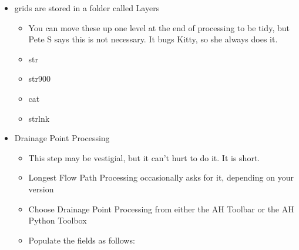 \documentclass[letterpaper,10pt,english]{sphinxmanual}
\begin{document}
\begin{itemize}
\item {} 
grids are stored in a folder called Layers
\begin{itemize}
\item {} 
You can move these up one level at the end of processing to be tidy, but Pete S says this is not necessary. It bugs Kitty, so she always does it.

\item {} 
str

\item {} 
str900

\item {} 
cat

\item {} 
strlnk

\end{itemize}

\item {} 
Drainage Point Processing
\begin{itemize}
\item {} 
This step may be vestigial, but it can’t hurt to do it. It is short.

\item {} 
Longest Flow Path Processing occasionally asks for it, depending on your version

\item {} 
Choose Drainage Point Processing from either the AH Toolbar or the AH Python Toolbox

\item {} 
Populate the fields as follows:

\end{itemize}

\end{itemize}
\end{document}
